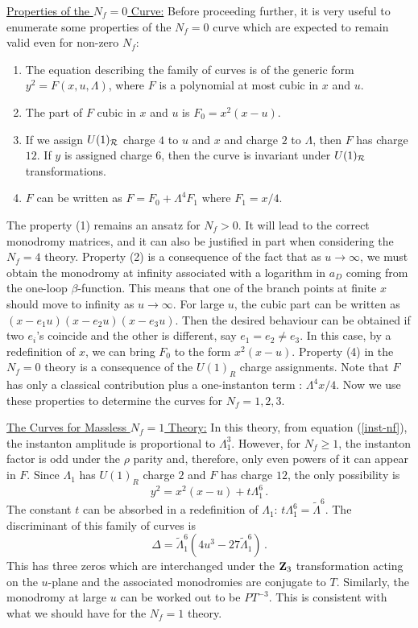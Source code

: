 \noindent\underline{Properties of the $N_f =0$ Curve:}
Before proceeding further, it is very useful to enumerate some
properties of the $N_f=0$ curve which are expected to remain valid
even for non-zero $N_f$: 
\begin{enumerate}
\item
The equation describing the family of curves is of the generic form
$y^2=F(x,u,\Lambda)$, where $F$ is a polynomial at most cubic in $x$
and $u$.
\item
The part of $F$ cubic in $x$ and $u$ is $F_0 = x^2 (x-u)$.
\item
If we assign $U(1)_{\cal R}$ charge $4$ to $u$ and $x$ and charge $2$
to $\Lambda$, then $F$ has charge $12$. If $y$ is assigned charge $6$,
then the curve is invariant under $U(1)_{\cal R}$ transformations. 
\item
$F$ can be written as $F = F_{0} + \Lambda^4 F_1$ where $F_1 = x/4$.
\end{enumerate}

The property (1) remains an ansatz for $N_f > 0$. It will lead to
the correct monodromy matrices, and it can also be justified in part
when considering the $N_f = 4$ theory.  Property (2) is a consequence
of the fact that as $u \rightarrow \infty$, we must obtain the
monodromy at infinity associated with a logarithm in $a_D$ coming
from the one-loop $\beta$-function. This means that one of the branch
points at finite $x$ should move to infinity as $u\rightarrow\infty$. 
For large $u$, the cubic part can be written as $(x-e_1 u)(x-e_2
u)(x-e_3 u)$. Then the desired behaviour can be obtained if two
$e_i$'s coincide and the other is different, say $e_1=e_2\not=e_3$.
In this case, by a redefinition of $x$, we can bring $F_0$ to the
form $x^2 (x-u)$. Property (4) in the $N_f = 0$ theory is a
consequence of the $U(1)_R$ charge assignments.  Note that $F$ has
only a classical contribution plus a one-instanton term : $\Lambda^4
x/4$.  Now we use these properties to determine the curves for 
$N_f = 1,2,3$.

\noindent\underline{The Curves for Massless $N_f=1$ Theory:}
In this theory, from equation (\ref{inst-nf}), the instanton amplitude
is proportional to $\Lambda^3_{1}$. However, for $N_f \geq 1$, the
instanton factor is odd under the $\rho$ parity and, therefore, only
even powers of it can appear in $F$. Since $\Lambda_{1}$ has $U(1)_R$
charge $2$ and $F$ has charge $12$, the only possibility is 
$$
y^2 = x^2 (x-u) + t \Lambda^{6}_{1} \,.
$$
The constant $t$ can be absorbed in a redefinition of $\Lambda_{1}$:
$t\Lambda^{6}_{1}=\tilde{\Lambda}^6$. The discriminant of this family
of curves is
$$
\Delta = \tilde{\Lambda}^{6}_{1} (4 u^3 - 27 \tilde{\Lambda}^{6}_{1})\,.
$$
This has three zeros which are interchanged under the ${\bf Z}_3$
transformation acting on the $u$-plane and the associated monodromies
are conjugate to $T$. Similarly, the monodromy at large $u$ can be
worked out to be $PT^{-3}$. This is consistent with what we should
have for the $N_f=1$ theory.

